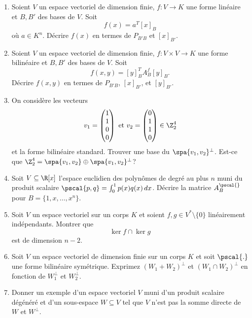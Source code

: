 \begin{enumerate}
\item Soient $V$ un espace vectoriel de dimension finie,  $f: V \longrightarrow K$ une forme linéaire et $B,B'$ des bases de $V$. Soit 
  \begin{displaymath}
    f(x) = a^T [x]_B 
  \end{displaymath}
  où $a \in K^n$. 
  Décrire $f(x)$ en termes de $P_{B'B}$ et $[x]_{B'}$. 
\item Soient $V$ un espace vectoriel de dimension finie,  $f: V\times V \longrightarrow K$ une forme bilinéaire et $B,B'$ des bases de $V$. Soit 
  \begin{displaymath}
    f(x,y) = [y]_B ^T A_B^f [y]_B.  
  \end{displaymath}
  Décrire $f(x,y)$ en termes de $P_{B'B}$, $[x]_{B'}$, et $[y]_{B'}$. 
\item On considère les vecteurs 
  \begin{displaymath}
    v_1 =
    \begin{pmatrix}
      1\\1\\0\\0
    \end{pmatrix} \text{ et }
 v_2 =
    \begin{pmatrix}
      0\\1\\1\\0
    \end{pmatrix} \in \Z_2^4
  \end{displaymath}
et la forme bilinéaire standard. Trouver une base du $\spa\{v_1,v_2\}^\perp$. Est-ce que $\Z_2^4 = \spa\{v_1,v_2\} \oplus \spa\{v_1,v_2\}^\perp$? 
\item Soit $V \subseteq \R[x]$ l'espace euclidien des polynômes de degré au plus $n$ muni du produit scalaire  $\pscal{p,q} = \int_0^1p(x)q(x) \, dx$.  Décrire la matrice $A_B^{\pscal{}}$ pour $B = \{1,x,\dots,x^n\}$. 
\item Soit $V$ un espace vectoriel sur un corps $K$ et soient $f,g \in V^* \setminus \{0\}$ linéairement indépendants. Montrer que
  \begin{displaymath}
    \ker{f} \cap \ker{g} 
  \end{displaymath}
est de dimension $n-2$. 
\item Soit $V$ un espace vectoriel de dimension finie sur un corps $K$ et soit $\pscal{.}$ une forme bilinéaire symétrique. Exprimez $(W_1 +W_2)^\perp$ et $(W_1\cap W_2)^\perp$ en fonction de $W_1^\perp$ et $W_2^\perp$. 


\item Donner un exemple d'un espace vectoriel  $V$ muni d'un produit scalaire dégénéré et d'un sous-espace $W \subseteq V$  tel que $V$ n'est pas la somme directe de $W$ et $W^\perp$. 
\end{enumerate}








